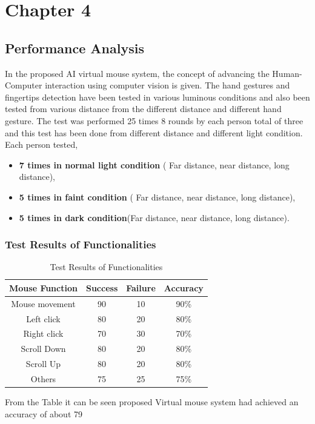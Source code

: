 \documentclass[12pt,a4paper]{report}
\begin{document}
				{\vfill \chapter*{\centering \vfill Chapter 4 \vfill}\vfill}
				\thispagestyle{empty}
	\newpage
	\label{Performance Analysis}
	\section{Performance Analysis}{
		In the proposed AI virtual mouse system, the concept of advancing the Human-Computer interaction using computer vision is given. The hand gestures and fingertips detection have been tested in various luminous conditions and also been tested from various distance from the different distance and different hand gesture. The test was performed 25 times 8 rounds by each person total of three and this test has been done from different distance and different light condition. Each person tested,

 	\begin{itemize}
    \item \textbf{7 times in normal light condition} ( Far distance, near     distance, long distance), 
    \item \textbf{5 times in faint condition} ( Far distance, near distance, long distance), 
    \item \textbf{5 times in dark condition}(Far distance, near distance, long distance). 
\end{itemize}
	\label{Test Results of Functionalities}
	\subsection{Test Results of Functionalities}
	\begin{table}[h]
    \centering
    \begin{tabular}{|c|c|c|c|}
        \hline
        \textbf{Mouse Function} & \textbf{Success} & \textbf{Failure} & \textbf{Accuracy} \\
        \hline
        Mouse movement & 90 & 10 & 90\% \\
        \hline
        Left click & 80 & 20 & 80\% \\
        \hline
        Right click & 70 & 30 & 70\% \\
        \hline
        Scroll Down & 80 & 20 & 80\% \\
        \hline
        Scroll Up & 80 & 20 & 80\% \\
        \hline
        Others & 75 & 25 & 75\% \\
        \hline
    \end{tabular}
    \caption{Test Results of Functionalities}
    \label{tab:Test Results of Functionalities}
\end{table}
From the Table it can be seen proposed Virtual mouse system had achieved an accuracy of about 79%
	}	
\newpage
	\label{Test Results in Different Conditions}
\end{document}
